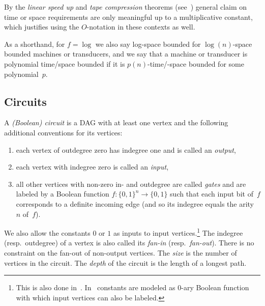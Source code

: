 By the \emph{linear speed up} and \emph{tape compression} theorems (see~\cite[Sect.~12.2]{HopUll79}) 
general claim on time or space requirements are only meaningful up to a multiplicative constant,
which justifies using the $O$-notation in these contexts as well.

As a shorthand, for $f = \log$ we also say log-space bounded for $\log(n)$-space bounded machines or transducers,
and we say that a machine or transducer is polynomial time/space bounded
if it is $p(n)$-time/-space bounded for some polynomial~$p$.

\subsection{Circuits}
\label{prelim:sec:circuits}


A \emph{(Boolean) circuit} is a DAG with at least one vertex
and the following additional conventions for its vertices:
\begin{enumerate}
\item each vertex of outdegree zero has indegree one and is called an \emph{output},

\item each vertex with indegree zero is called an \emph{input},

\item all other vertices with non-zero in- and outdegree are called \emph{gates} and are labeled 
by a Boolean function $f \colon \{0,1\}^n \to \{0,1\}$ 
such that each input bit of~$f$ corresponds to a definite incoming edge (and so 
its indegree equals the arity~$n$ of~$f$).
\end{enumerate}
We also allow the constants $0$ or $1$ as inputs to input vertices.\footnote{This is also done in~\cite{DBLP:journals/siamcomp/Borodin77}. 
	In~\cite[Def.~1.6]{Vollmer99} constants are modeled as $0$-ary Boolean function
	with which input vertices can also be labeled.}
The indegree (resp.~outdegree) of a vertex is also called its \emph{fan-in} (resp.~\emph{fan-out}).  
There is no constraint on the fan-out of non-output vertices.
The \emph{size} is the number of vertices in the circuit.
The \emph{depth} of the circuit is the length of a longest path.

